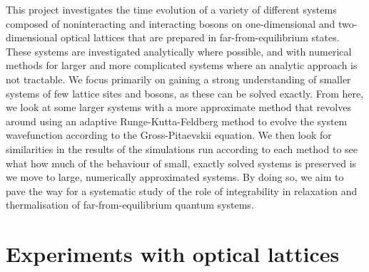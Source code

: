 \documentclass[a4paper, 10pt]{article}
\theoremstyle{plain}
\begin{document}
This project investigates the time evolution of a variety of different systems
composed of noninteracting and interacting bosons on one-dimensional and
two-dimensional optical lattices that are prepared in far-from-equilibrium
states. These systems are investigated analytically where possible, and with
numerical methods for larger and more complicated systems where an analytic
approach is not tractable. We focus primarily on gaining a strong
understanding of smaller systems of few lattice sites and bosons, as these
can be solved exactly. From here, we look at some larger systems with a more
approximate method that revolves around using an adaptive Runge-Kutta-Feldberg
method to evolve the system wavefunction according to the Gross-Pitaevskii
equation. We then look for similarities in the results of the simulations run
according to each method to see what how much of the behaviour of small,
exactly solved systems is preserved is we move to large, numerically approximated
systems. By doing so, we aim to pave the way for a systematic study of the role
of integrability in relaxation and thermalisation of far-from-equilibrium
quantum systems.
\newpage


\section{Experiments with optical lattices}
\end{document}
